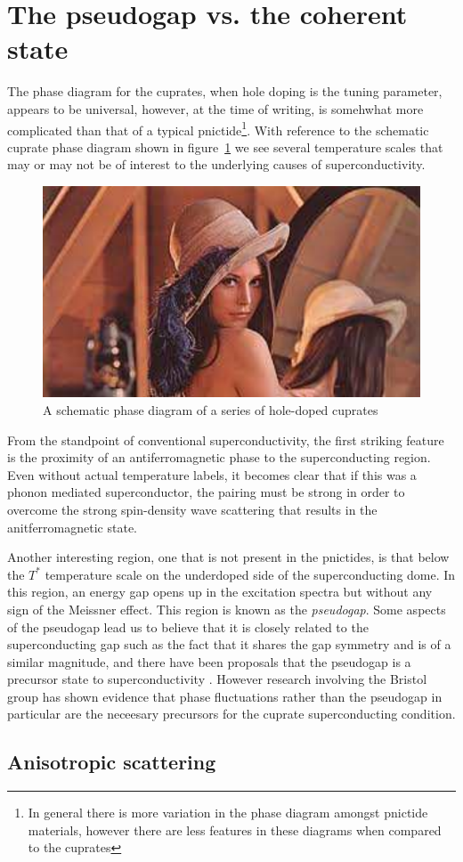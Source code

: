 
\section{The pseudogap vs. the coherent state}

The phase diagram for the cuprates, when hole doping is the tuning parameter, appears to be universal, however, at the time of writing, is somehwhat more complicated than that of a typical pnictide\footnote{In general there is more variation in the phase diagram amongst pnictide materials, however there are less features in these diagrams when compared to the cuprates}. With reference to the schematic cuprate phase diagram shown in figure~\ref{Fig:Intro:UniversalCupratePhaseDiagram} we see several temperature scales that may or may not be of interest to the underlying causes of \highTc superconductivity.
\begin{figure}[htbp]
    \begin{center}
        \includegraphics[scale=0.7]{Misc/TODO}
        \caption{A schematic phase diagram of a series of hole-doped cuprates}
        \label{Fig:Intro:UniversalCupratePhaseDiagram}
    \end{center}
\end{figure}
From the standpoint of conventional superconductivity, the first striking feature is the proximity of an antiferromagnetic phase to the superconducting region. Even without actual temperature labels, it becomes clear that if this was a phonon mediated superconductor, the pairing must be strong in order to overcome the strong spin-density wave scattering that results in the anitferromagnetic state.

Another interesting region, one that is not present in the pnictides, is that below the $T^*$ temperature scale on the underdoped side of the superconducting dome. In this region, an energy gap opens up in the excitation spectra but without any sign of the Meissner effect. This region is known as the \textit{pseudogap}. Some aspects of the pseudogap lead us to believe that it is closely related to the superconducting gap such as the fact that it shares the gap symmetry and is of a similar magnitude, and there have been proposals that the pseudogap is a precursor state to superconductivity . However research involving the Bristol group has shown evidence that phase fluctuations rather than the pseudogap in particular are the neceesary precursors for the cuprate superconducting condition\cite{Rourke2011}.

\subsection{Anisotropic scattering}


